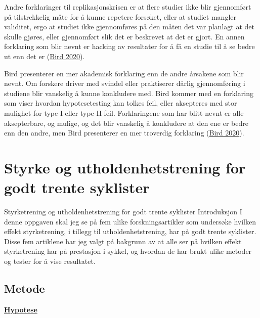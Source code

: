 \documentclass[
]{book}
\begin{document}
Andre forklaringer til replikasjonskrisen er at flere studier ikke blir
gjennomført på tilstrekkelig måte for å kunne repetere forsøket, eller
at studiet mangler validitet, ergo at studiet ikke gjennomføres på den
måten det var planlagt at det skulle gjøres, eller gjennomført slik det
er beskrevet at det er gjort. En annen forklaring som blir nevnt er
hacking av resultater for å få en studie til å se bedre ut enn det er
(\protect\hyperlink{ref-bird2020}{Bird 2020}).

Bird presenterer en mer akademisk forklaring enn de andre årsakene som
blir nevnt. Om forskere driver med svindel eller praktiserer dårlig
gjennomføring i studiene blir vanskelig å kunne konkludere med. Bird
kommer med en forklaring som viser hvordan hypotesetesting kan tolkes
feil, eller aksepteres med stor mulighet for type-I eller type-II feil.
Forklaringene som har blitt nevnt er alle aksepterbare, og mulige, og
det blir vanskelig å konkludere at den ene er bedre enn den andre, men
Bird presenterer en mer troverdig forklaring
(\protect\hyperlink{ref-bird2020}{Bird 2020}).

\hypertarget{styrke-og-utholdenhetstrening-for-godt-trente-syklister}{%
\chapter{Styrke og utholdenhetstrening for godt trente
syklister}\label{styrke-og-utholdenhetstrening-for-godt-trente-syklister}}

Styrketrening og utholdenhetstrening for godt trente syklister
Introduksjon I denne oppgaven skal jeg se på fem ulike
forskningsartikler som undersøke hvilken effekt styrketrening, i tillegg
til utholdenhetstrening, har på godt trente syklister. Disse fem
artiklene har jeg valgt på bakgrunn av at alle ser på hvilken effekt
styrketrening har på prestasjon i sykkel, og hvordan de har brukt ulike
metoder og tester for å vise resultatet.

\hypertarget{metode-2}{%
\section{Metode}\label{metode-2}}

\underline{\textbf{Hypotese}}
\end{document}
